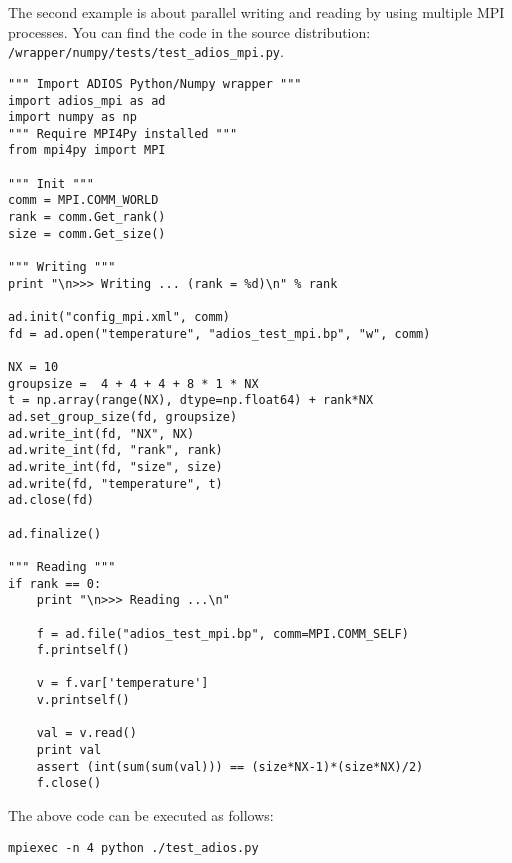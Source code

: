 The second example is about parallel writing and reading by using multiple MPI processes. You can find the code in the source distribution: \verb+/wrapper/numpy/tests/test_adios_mpi.py+.

\begin{lstlisting}[language=ADIOS-python,caption={A Python/Numpy example for parallel writing/reading ADIOS BP file},label={},]
""" Import ADIOS Python/Numpy wrapper """
import adios_mpi as ad
import numpy as np
""" Require MPI4Py installed """
from mpi4py import MPI

""" Init """
comm = MPI.COMM_WORLD
rank = comm.Get_rank()
size = comm.Get_size()

""" Writing """
print "\n>>> Writing ... (rank = %d)\n" % rank

ad.init("config_mpi.xml", comm)
fd = ad.open("temperature", "adios_test_mpi.bp", "w", comm)

NX = 10
groupsize =  4 + 4 + 4 + 8 * 1 * NX
t = np.array(range(NX), dtype=np.float64) + rank*NX
ad.set_group_size(fd, groupsize)
ad.write_int(fd, "NX", NX)
ad.write_int(fd, "rank", rank)
ad.write_int(fd, "size", size)
ad.write(fd, "temperature", t)
ad.close(fd)

ad.finalize()

""" Reading """
if rank == 0:
    print "\n>>> Reading ...\n"

    f = ad.file("adios_test_mpi.bp", comm=MPI.COMM_SELF)
    f.printself()

    v = f.var['temperature']
    v.printself()

    val = v.read()
    print val
    assert (int(sum(sum(val))) == (size*NX-1)*(size*NX)/2)
    f.close()

\end{lstlisting}

The above code can be executed as follows:
\begin{lstlisting}
mpiexec -n 4 python ./test_adios.py
\end{lstlisting}
